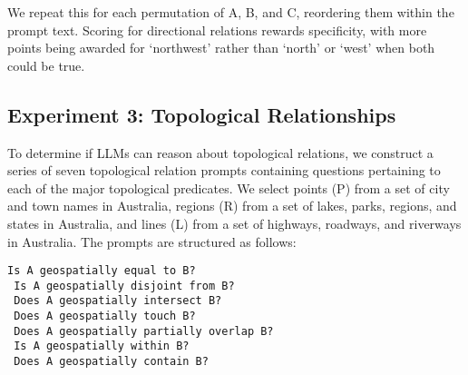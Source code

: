 \noindent We repeat this for each permutation of A, B, and C, reordering them within the prompt text.
Scoring for directional relations rewards specificity, with more points being awarded for `northwest' rather than `north' or `west' when both could be true. 



\subsection{Experiment 3: Topological Relationships}
To determine if LLMs can reason about topological relations, we construct a series of seven topological relation prompts containing questions pertaining to each of the major topological predicates.
We select points (P) from a set of city and town names in Australia, regions (R) from a set of lakes, parks, regions, and states in Australia, and lines (L) from a set of highways, roadways, and riverways in Australia.
The prompts are structured as follows:

\begin{lstlisting}[title=Prompts 5-11: Topological Relation Prompts]
 Is A geospatially equal to B?
 Is A geospatially disjoint from B?
 Does A geospatially intersect B?
 Does A geospatially touch B?
 Does A geospatially partially overlap B?
 Is A geospatially within B?
 Does A geospatially contain B?
\end{lstlisting}

